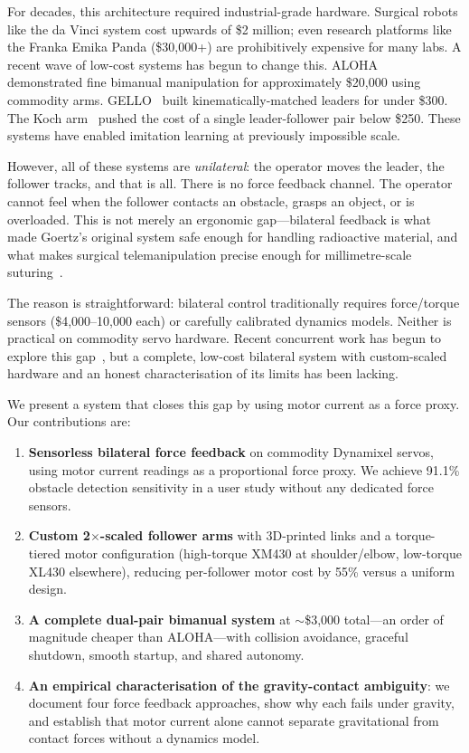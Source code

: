 \documentclass[conference]{IEEEtran}
\begin{document}
For decades, this architecture required industrial-grade hardware. Surgical robots like the da Vinci system cost upwards of \$2 million; even research platforms like the Franka Emika Panda (\$30,000+) are prohibitively expensive for many labs. A recent wave of low-cost systems has begun to change this. ALOHA~\cite{zhao2023aloha} demonstrated fine bimanual manipulation for approximately \$20,000 using commodity arms. GELLO~\cite{wu_2024_gello} built kinematically-matched leaders for under \$300. The Koch arm~\cite{koch2024} pushed the cost of a single leader-follower pair below \$250. These systems have enabled imitation learning at previously impossible scale.

However, all of these systems are \emph{unilateral}: the operator moves the leader, the follower tracks, and that is all. There is no force feedback channel. The operator cannot feel when the follower contacts an obstacle, grasps an object, or is overloaded. This is not merely an ergonomic gap---bilateral feedback is what made Goertz's original system safe enough for handling radioactive material, and what makes surgical telemanipulation precise enough for millimetre-scale suturing~\cite{enayati_2016_haptics, vandermeijden2009}.

The reason is straightforward: bilateral control traditionally requires force/torque sensors (\$4,000--10,000 each) or carefully calibrated dynamics models. Neither is practical on commodity servo hardware. Recent concurrent work has begun to explore this gap~\cite{echo2025, sujit_2025_improving, kobayashi2024}, but a complete, low-cost bilateral system with custom-scaled hardware and an honest characterisation of its limits has been lacking.

We present a system that closes this gap by using motor current as a force proxy. Our contributions are:

\begin{enumerate}
    \item \textbf{Sensorless bilateral force feedback} on commodity Dynamixel servos, using motor current readings as a proportional force proxy. We achieve 91.1\% obstacle detection sensitivity in a user study without any dedicated force sensors.

    \item \textbf{Custom 2$\times$-scaled follower arms} with 3D-printed links and a torque-tiered motor configuration (high-torque XM430 at shoulder/elbow, low-torque XL430 elsewhere), reducing per-follower motor cost by 55\% versus a uniform design.

    \item \textbf{A complete dual-pair bimanual system} at $\sim$\$3,000 total---an order of magnitude cheaper than ALOHA---with collision avoidance, graceful shutdown, smooth startup, and shared autonomy.

    \item \textbf{An empirical characterisation of the gravity-contact ambiguity}: we document four force feedback approaches, show why each fails under gravity, and establish that motor current alone cannot separate gravitational from contact forces without a dynamics model.
\end{enumerate}
\end{document}
